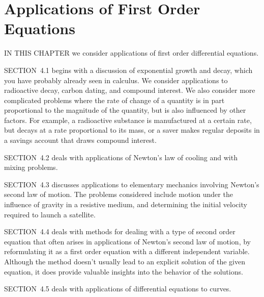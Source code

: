 \chapter{Applications of First Order Equations}

\noindent
IN THIS CHAPTER we consider applications of first order differential equations.

\medskip
\noindent
SECTION~4.1 begins with a discussion of exponential growth and decay, which you have probably
already seen in calculus. We consider applications to radioactive decay, carbon dating, and compound
interest. We also consider more complicated problems where the rate of change of a quantity is in
part proportional to the magnitude of the quantity, but is also influenced by other factors. For
example, a radioactive substance is manufactured at a certain rate, but decays at a rate
proportional to its mass, or a saver makes regular deposits in a savings account that draws compound
interest.

\medskip
\noindent
SECTION~4.2 deals with applications of Newton's law of cooling and with mixing problems.

\medskip
\noindent
SECTION~4.3 discusses applications to elementary mechanics involving Newton's second law of motion.
The problems considered include motion under the influence of gravity in a resistive medium, and
determining the initial velocity required to launch a satellite.

\medskip
\noindent
SECTION~4.4 deals with methods for dealing with a type of second order equation that often arises in
applications of Newton's second law of motion, by reformulating it as a first order equation with a
different independent variable. Although the method doesn't usually lead to an explicit solution of
the given equation, it does provide valuable insights into the behavior of the solutions.

\medskip
\noindent
SECTION~4.5 deals with applications of differential equations to curves.

\newpage










